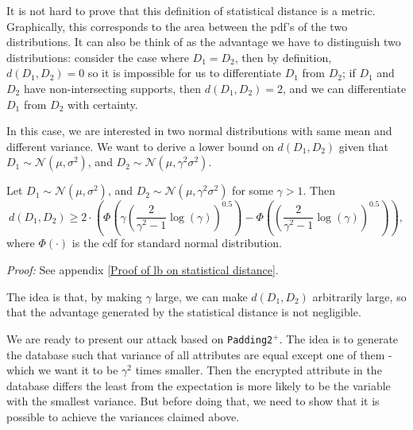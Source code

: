 It is not hard to prove that this definition of statistical distance is a metric. Graphically, this corresponds to the area between the pdf's of the two distributions. It can also be think of as the advantage we have to distinguish two distributions: consider the case where $D_1 = D_2$, then by definition, $d(D_1, D_2) = 0$ so it is impossible for us to differentiate $D_1$ from $D_2$; if $D_1$ and $D_2$ have non-intersecting supports, then $d(D_1, D_2) = 2$, and we can differentiate $D_1$ from $D_2$ with certainty.

In this case, we are interested in two normal distributions with same mean and different variance. We want to derive a lower bound on $d(D_1, D_2)$ given that $D_1 \sim \mathcal{N}(\mu, \sigma^2)$, and $D_2 \sim \mathcal{N}(\mu, \gamma^2\sigma^2)$.

\begin{theorem} \label{thm lb on statistical distance}
	Let $D_1 \sim \mathcal{N}(\mu, \sigma^2)$, and $D_2 \sim \mathcal{N}(\mu, \gamma^2\sigma^2)$ for some $\gamma > 1$. Then
	\begin{equation}
		d(D_1, D_2) \geq 2 \cdot \left( \Phi\left( \gamma\left( \frac{2}{\gamma^2 - 1} \log(\gamma) \right)^{0.5} \right) - \Phi\left( \left( \frac{2}{\gamma^2 - 1} \log(\gamma) \right)^{0.5} \right) \right),
	\end{equation}
	where $\Phi(\cdot)$ is the cdf for standard normal distribution.
\end{theorem}

\textit{Proof:} See appendix \ref{Proof of lb on statistical distance}.

The idea is that, by making $\gamma$ large, we can make $d(D_1,D_2)$ arbitrarily large, so that the advantage generated by the statistical distance is not negligible.

We are ready to present our attack based on \texttt{Padding2}$^{+}$. The idea is to generate the database such that variance of all attributes are equal except one of them - which we want it to be $\gamma^2$ times smaller. Then the encrypted attribute in the database differs the least from the expectation is more likely to be the variable with the smallest variance. But before doing that, we need to show that it is possible to achieve the variances claimed above.

